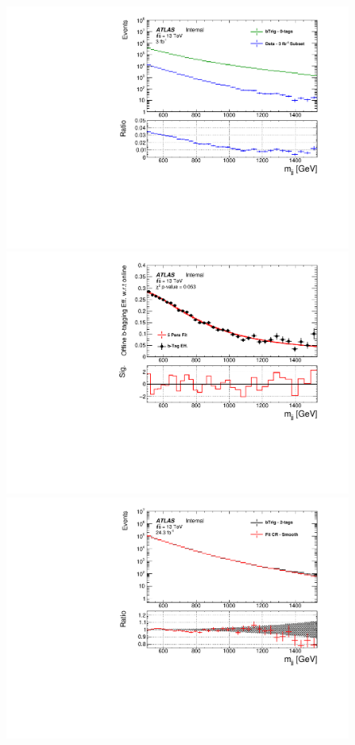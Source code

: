 \begin{figure}[!htb]
\captionsetup[subfigure]{aboveskip=0pt,justification=centering}
\centering
\hspace{-2mm}
 {
  \includegraphics[width=0.51\linewidth, angle=0]{figs/Dibjet/LowMass/FitStudy/corrFitCR_0tag_subset.pdf}
}\hspace{-8mm}
 {
  \includegraphics[width=0.51\linewidth, angle=0]{figs/Dibjet/LowMass/FitStudy/corrFitCR_5parFit.pdf}
} \hspace{-2mm} \\
\hspace{-2mm}
 {
  \includegraphics[width=0.51\linewidth, angle=0]{figs/Dibjet/LowMass/FitStudy/corrFitCR_dataComp.pdf}
}\hspace{-8mm}
 {
}
\end{figure}
